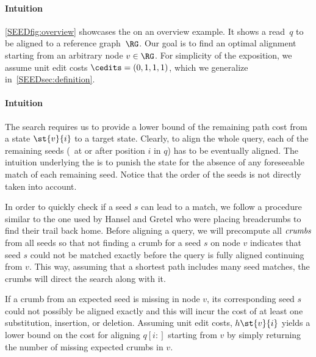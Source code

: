 

\paragraph{Intuition} \label{SEEDsec:overview}
\cref{SEEDfig:overview} showcases the \seedh on an overview example. It shows a
read~$q$ to be aligned to a reference graph~$\RG$. Our goal is to find an
optimal alignment starting from an arbitrary node $v \in \RG$.
%
For simplicity of the exposition, we assume unit edit costs $\cedits =
(0,1,1,1)$, which we generalize in~\cref{SEEDsec:definition}.

\paragraph{Intuition}
The \A search requires us to provide a lower bound of the remaining path cost
from a state $\st{v}{i}$ to a target state. Clearly, to align the whole query,
each of the remaining seeds (\ie~at or after position $i$ in $q$) has to be
eventually aligned. The intuition underlying the \seedh is to punish the state
for the absence of any foreseeable match of each remaining seed. Notice that the
order of the seeds is not directly taken into account.

In order to quickly check if a seed $s$ can lead to a match, we follow a
procedure similar to the one used by Hansel and Gretel who were placing
breadcrumbs to find their trail back home. Before aligning a query, we will
precompute all $\emph{crumbs}$ from all seeds so that not finding a crumb for
a seed $s$ on node $v$ indicates that seed $s$ could not be matched exactly
before the query is fully aligned continuing from $v$. This way, assuming that a
shortest path includes many seed matches, the crumbs will direct the \A search
along with it.

If a crumb from an expected seed is missing in node $v$, its corresponding seed
$s$ could not possibly be aligned exactly and this will incur the cost of at
least one substitution, insertion, or deletion. Assuming unit edit costs,
$h\st{v}{i}$ yields a lower bound on the cost for aligning $q[i{:}]$ starting
from $v$ by simply returning the number of missing expected crumbs in $v$.

